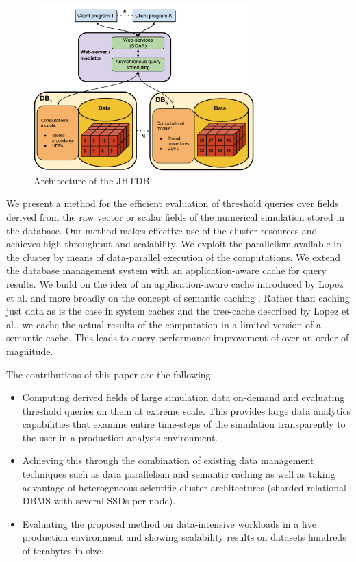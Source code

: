 \documentclass{sig-alternate}
\begin{document}
\begin{figure}
\centering
\includegraphics[width=3.35in]{Figures/jhtdb_diagram.pdf}
\caption{Architecture of the JHTDB.}
\label{fig:jhtdb_diagram}
\end{figure}

We present a method for the efficient evaluation of threshold queries over fields derived from the raw vector or scalar fields of the numerical simulation 
stored in the database. 
Our method makes effective use of the cluster resources and achieves high throughput and scalability. 
We exploit the parallelism 
available in the cluster by means of data-parallel execution of the computations. 
We extend the database management system with an
application-aware cache for query results. We build on the idea of an application-aware cache introduced by Lopez et al. \cite{Lopez} and more broadly 
on the concept of semantic caching \cite{Dar}. Rather than caching just data as is the case in system caches and the tree-cache described by Lopez et al.,
we cache the actual results of the computation in a limited version of a semantic cache. 
This leads to query performance improvement of over an order of magnitude.

The contributions of this paper are the following:
\begin{itemize}
\item Computing derived fields of large simulation data on-demand and evaluating threshold queries on them at extreme scale. This provides large
data analytics capabilities that examine entire time-steps of the simulation transparently to the user in a production analysis environment.
\item Achieving this through the combination of existing data management techniques such as data parallelism and semantic caching as well as taking
advantage of heterogeneous scientific cluster architectures (sharded relational DBMS with several SSDs per node).
\item Evaluating the proposed method on data-intensive workloads in a live production environment and showing scalability results on datasets hundreds of terabytes in size.
\end{itemize}
\end{document}
